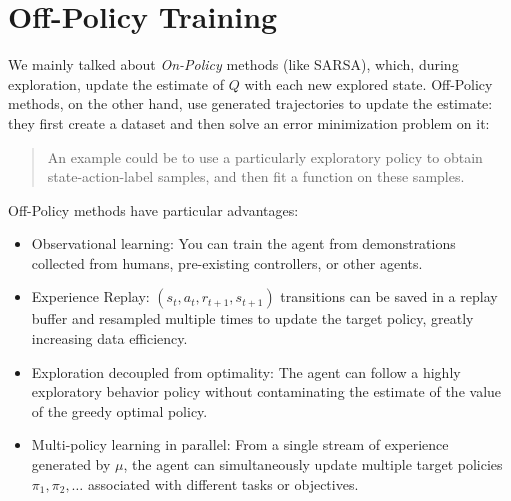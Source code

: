 \documentclass[10pt, a4paper]{report}
\begin{document}
\section{Off-Policy Training}
We mainly talked about \textit{On-Policy} methods (like SARSA), which, during exploration, update the estimate of $Q$ with each new explored state. Off-Policy methods, on the other hand, use generated trajectories to update the estimate: they first create a dataset and then solve an error minimization problem on it:\begin{quote}
    An example could be to use a particularly exploratory policy to obtain state-action-label samples, and then fit a function on these samples.
\end{quote}
Off-Policy methods have particular advantages:\begin{itemize}
    \item Observational learning: You can train the agent from demonstrations collected from humans, pre-existing controllers, or other agents. \item Experience Replay: $(s_t, a_t, r_{t+1}, s_{t+1})$ transitions can be saved in a replay buffer and resampled multiple times to update the target policy, greatly increasing data efficiency. \item Exploration decoupled from optimality: The agent can follow a highly exploratory behavior policy without contaminating the estimate of the value of the greedy optimal policy. \item Multi-policy learning in parallel: From a single stream of experience generated by $\mu$, the agent can simultaneously update multiple target policies $\pi_1, \pi_2, \dots$ associated with different tasks or objectives.
\end{itemize}
\end{document}
